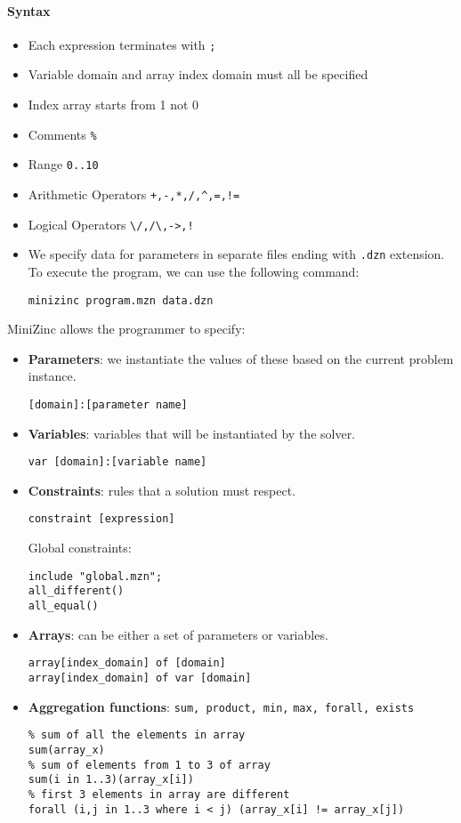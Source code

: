 \documentclass{article}
\begin{document}
\paragraph{Syntax}
\begin{itemize}
    \item Each expression terminates with \texttt{;}
    \item Variable domain and array index domain must all be specified
    \item Index array starts from 1 not 0
    \item Comments \texttt{\%} 
    \item Range \texttt{0..10}
    \item Arithmetic Operators \verb|+,-,*,/,^,=,!=|
    \item Logical Operators \verb|\/,/\,->,!|
    \item We specify data for parameters in separate files ending with
        \texttt{.dzn} extension. To execute the program, we can use the
        following command:
        \begin{verbatim}
minizinc program.mzn data.dzn
        \end{verbatim}
\end{itemize}
MiniZinc allows the programmer to specify:
\begin{itemize}
    \item \textbf{Parameters}: we instantiate the values of these based on the
        current problem instance.
        \begin{verbatim}
[domain]:[parameter name]
        \end{verbatim}
    \item \textbf{Variables}: variables that will be instantiated by the
        solver.
        \begin{verbatim}
var [domain]:[variable name]
        \end{verbatim}
    \item \textbf{Constraints}: rules that a solution must respect.
        \begin{verbatim}
constraint [expression]
        \end{verbatim}
        Global constraints:
        \begin{verbatim}
include "global.mzn";
all_different()
all_equal()
        \end{verbatim}
    \item \textbf{Arrays}: can be either a set of parameters or variables.
        \begin{verbatim}
array[index_domain] of [domain]
array[index_domain] of var [domain]
        \end{verbatim}
    \item \textbf{Aggregation functions}: \verb|sum, product, min,|
        \verb|max, forall, exists|
        \begin{verbatim}
% sum of all the elements in array
sum(array_x) 
% sum of elements from 1 to 3 of array
sum(i in 1..3)(array_x[i])
% first 3 elements in array are different
forall (i,j in 1..3 where i < j) (array_x[i] != array_x[j])
        \end{verbatim}
\end{itemize}
\end{document}
